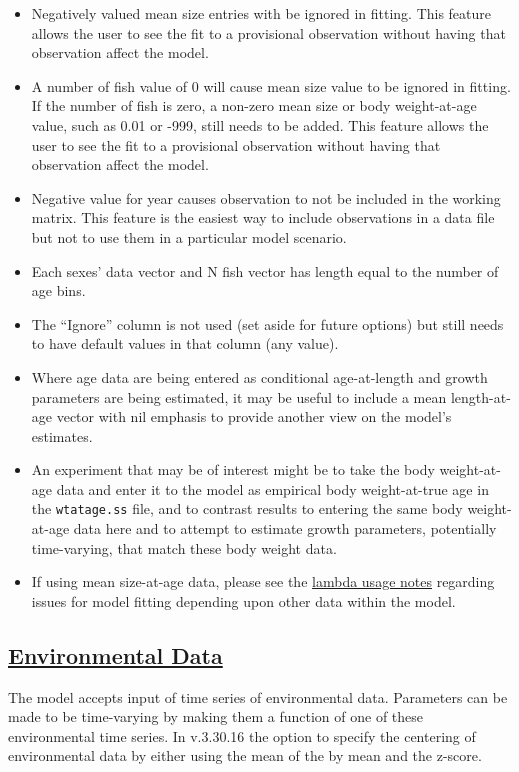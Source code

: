 	\begin{itemize}
		\item Negatively valued mean size entries with be ignored in fitting. This feature allows the user to see the fit to a provisional observation without having that observation affect the model.
		\item A number of fish value of 0 will cause mean size value to be ignored in fitting. If the number of fish is zero, a non-zero mean size or body weight-at-age value, such as 0.01 or -999, still needs to be added. This feature allows the user to see the fit to a provisional observation without having that observation affect the model.
		\item Negative value for year causes observation to not be included in the working matrix. This feature is the easiest way to include observations in a data file but not to use them in a particular model scenario.
		\item Each sexes' data vector and N fish vector has length equal to the number of age bins.
		\item The ``Ignore'' column is not used (set aside for future options) but still needs to have default values in that column (any value). 
		\item Where age data are being entered as conditional age-at-length and growth parameters are being estimated, it may be useful to include a mean length-at-age vector with nil emphasis to provide another view on the model's estimates.
		\item An experiment that may be of interest might be to take the body weight-at-age data and enter it to the model as empirical body weight-at-true age in the \texttt{wtatage.ss} file, and to contrast results to entering the same body weight-at-age data here and to attempt to estimate growth parameters, potentially time-varying, that match these body weight data.
		\item If using mean size-at-age data, please see the \hyperlink{SaAlambda}{lambda usage notes} regarding issues for model fitting depending upon other data within the model.  		
	\end{itemize}

\hypertarget{env-dat}{}
\subsection[Environmental Data]{\protect\hyperlink{env-dat}{Environmental Data}}
The model accepts input of time series of environmental data. Parameters can be made to be time-varying by making them a function of one of these environmental time series. In v.3.30.16 the option to specify the centering of environmental data by either using the mean of the by mean and the z-score. 

